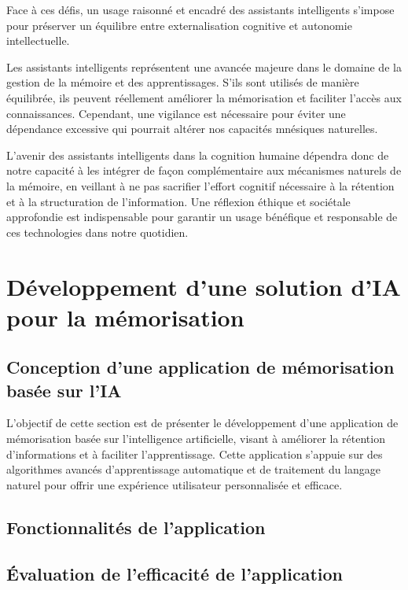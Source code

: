 \documentclass[11pt,a4paper]{report}
\begin{document}
Face à ces défis, un usage raisonné et encadré des assistants intelligents s’impose pour préserver un équilibre entre externalisation cognitive et autonomie intellectuelle.

Les assistants intelligents représentent une avancée majeure dans le domaine de la gestion de la mémoire et des apprentissages. S’ils sont utilisés de manière équilibrée, ils peuvent réellement améliorer la mémorisation et faciliter l’accès aux connaissances. Cependant, une vigilance est nécessaire pour éviter une dépendance excessive qui pourrait altérer nos capacités mnésiques naturelles.

L’avenir des assistants intelligents dans la cognition humaine dépendra donc de notre capacité à les intégrer de façon complémentaire aux mécanismes naturels de la mémoire, en veillant à ne pas sacrifier l’effort cognitif nécessaire à la rétention et à la structuration de l’information. Une réflexion éthique et sociétale approfondie est indispensable pour garantir un usage bénéfique et responsable de ces technologies dans notre quotidien.

\section{Développement d'une solution d'IA pour la mémorisation}

\subsection{Conception d'une application de mémorisation basée sur l'IA}
L’objectif de cette section est de présenter le développement d’une application de mémorisation basée sur l’intelligence artificielle, visant à améliorer la rétention d’informations et à faciliter l’apprentissage. Cette application s’appuie sur des algorithmes avancés d’apprentissage automatique et de traitement du langage naturel pour offrir une expérience utilisateur personnalisée et efficace.

\subsection{Fonctionnalités de l'application}

\subsection{Évaluation de l'efficacité de l'application}

\end{document}
